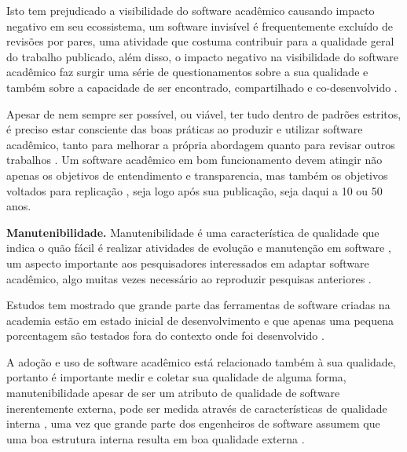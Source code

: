 Isto tem prejudicado a visibilidade do software acadêmico causando impacto
negativo em seu ecossistema, um software invisível é frequentemente excluído de
revisões por pares, uma atividade que costuma contribuir para a qualidade geral
do trabalho publicado, além disso, o
impacto negativo na visibilidade do software acadêmico faz surgir uma
série de questionamentos sobre a sua qualidade e também sobre a
capacidade de ser encontrado, compartilhado e co-desenvolvido
\cite{howison2013incentives, katz2014transitive} \cite{howison2016software}.

Apesar de nem sempre ser possível, ou viável, ter tudo dentro de padrões
estritos, é preciso estar consciente das boas práticas ao produzir e utilizar
software acadêmico, tanto para melhorar a própria abordagem quanto para
revisar outros trabalhos \cite{wilson2014best}. Um software acadêmico em bom
funcionamento devem atingir não apenas os objetivos de entendimento e
transparencia, mas também os objetivos voltados para replicação
\cite{stodden2010reproducible}, seja logo após sua publicação, seja daqui a 10 ou 50 anos.

\vspace*{0.25cm}

\noindent \textbf{Manutenibilidade.}
Manutenibilidade é uma característica de qualidade que indica o quão fácil é
realizar atividades de evolução e manutenção em software
\cite{kumar2012survey}, um aspecto importante aos pesquisadores interessados em
adaptar software acadêmico, algo muitas vezes necessário ao reproduzir
pesquisas anteriores \cite{peng2011reproducible}.

Estudos tem mostrado que grande parte das ferramentas de software criadas na
academia estão em estado inicial de desenvolvimento \cite{marshall2013tools} e
que apenas uma pequena porcentagem são testados fora do contexto onde foi
desenvolvido \cite{portillo2012tools}.


A adoção e uso de software acadêmico está relacionado também à sua qualidade,
portanto é importante medir e coletar sua qualidade de alguma forma,
manutenibilidade apesar de ser um atributo de qualidade de software
inerentemente externa, pode ser medida através de
características de qualidade interna \cite{hashim1996software,
dagpinar2003predicting}, uma vez que grande parte dos engenheiros de software
assumem que uma boa estrutura interna resulta em boa qualidade externa
\cite{fenton2014software}.

